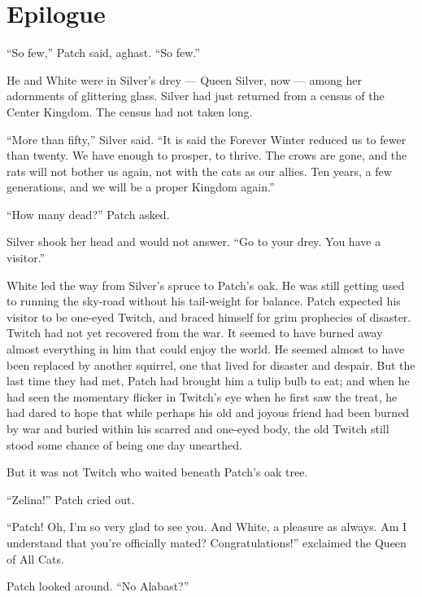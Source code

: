 \documentclass[ebook,oneside,openany,12pt]{memoir}
\begin{document}
\section{Epilogue}

“So few,” Patch said, aghast. “So few.”

He and White were in Silver’s drey — Queen Silver, now — among her
adornments of glittering glass. Silver had just returned from a census
of the Center Kingdom. The census had not taken long.

“More than fifty,” Silver said. “It is said the Forever Winter reduced
us to fewer than twenty. We have enough to prosper, to thrive. The
crows are gone, and the rats will not bother us again, not with the
cats as our allies. Ten years, a few generations, and we will be a
proper Kingdom again.”

“How many dead?” Patch asked.

Silver shook her head and would not answer. “Go to your drey. You have
a visitor.”

White led the way from Silver’s spruce to Patch’s oak. He was still
getting used to running the sky-road without his tail-weight for
balance. Patch expected his visitor to be one-eyed Twitch, and braced
himself for grim prophecies of disaster. Twitch had not yet recovered
from the war. It seemed to have burned away almost everything in him
that could enjoy the world. He seemed almost to have been replaced by
another squirrel, one that lived for disaster and despair. But the
last time they had met, Patch had brought him a tulip bulb to eat; and
when he had seen the momentary flicker in Twitch’s eye when he first
saw the treat, he had dared to hope that while perhaps his old and
joyous friend had been burned by war and buried within his scarred and
one-eyed body, the old Twitch still stood some chance of being one day
unearthed.

But it was not Twitch who waited beneath Patch’s oak tree.

“Zelina!” Patch cried out.

“Patch! Oh, I’m so very glad to see you. And White, a pleasure as
always. Am I understand that you’re officially mated?
Congratulations!” exclaimed the Queen of All Cats.

Patch looked around. “No Alabast?”
\end{document}
